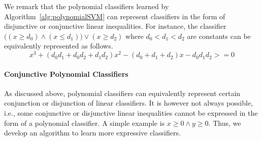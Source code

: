 We remark that the polynomial classifiers learned by Algorithm~\ref{alg:polynomialSVM} can represent classifiers in the form of disjunctive or conjunctive linear inequalities.
For instance, the classifier $\big((x \ge d_0) \wedge (x \le d_1)\big) \vee (x \ge d_2)$
where $d_0 < d_1 < d_2$ are constants can be equivalently represented as follows.
\[x^3 + (d_0d_1 + d_0d_2 + d_1d_2)x^2 - (d_0 + d_1 + d_2)x - d_0d_1d_2 >= 0\]


\paragraph{Conjunctive Polynomial Classifiers}
As discussed above, polynomial classifiers can equivalently represent certain conjunction or disjunction of linear classifiers. It is however not always possible, i.e., some conjunctive or disjunctive linear inequalities cannot be expressed in the form of a polynomial classifier. A simple example is $x \ge 0 \land y \ge 0$. Thus, we develop an algorithm to learn more expressive classifiers.

